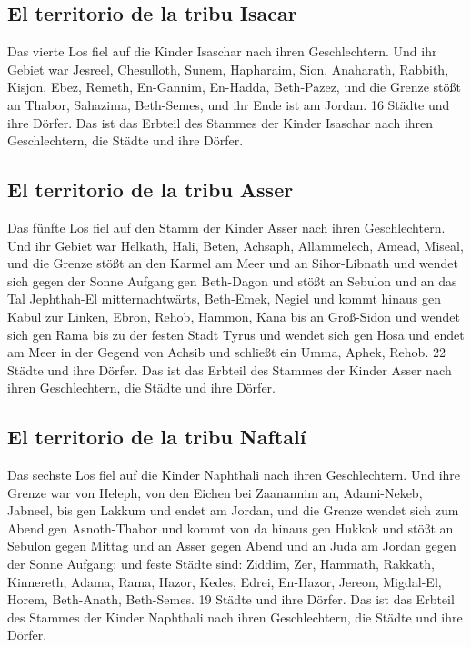 \hypertarget{el-territorio-de-la-tribu-isacar}{%
\subsection{El territorio de la tribu
Isacar}\label{el-territorio-de-la-tribu-isacar}}

 Das vierte Los fiel auf die Kinder Isaschar nach ihren
Geschlechtern.  Und ihr Gebiet war Jesreel, Chesulloth,
Sunem,  Hapharaim, Sion, Anaharath, 
Rabbith, Kisjon, Ebez,  Remeth, En-Gannim, En-Hadda,
Beth-Pazez,  und die Grenze stößt an Thabor, Sahazima,
Beth-Semes, und ihr Ende ist am Jordan. 16 Städte und ihre Dörfer.
 Das ist das Erbteil des Stammes der Kinder Isaschar nach
ihren Geschlechtern, die Städte und ihre Dörfer.

\hypertarget{el-territorio-de-la-tribu-asser}{%
\subsection{El territorio de la tribu
Asser}\label{el-territorio-de-la-tribu-asser}}

 Das fünfte Los fiel auf den Stamm der Kinder Asser nach
ihren Geschlechtern.  Und ihr Gebiet war Helkath, Hali,
Beten, Achsaph,  Allammelech, Amead, Miseal, und die
Grenze stößt an den Karmel am Meer und an Sihor-Libnath 
und wendet sich gegen der Sonne Aufgang gen Beth-Dagon und stößt an
Sebulon und an das Tal Jephthah-El mitternachtwärts, Beth-Emek, Negiel
und kommt hinaus gen Kabul zur Linken,  Ebron, Rehob,
Hammon, Kana bis an Groß-Sidon  und wendet sich gen Rama
bis zu der festen Stadt Tyrus und wendet sich gen Hosa und endet am Meer
in der Gegend von Achsib  und schließt ein Umma, Aphek,
Rehob. 22 Städte und ihre Dörfer.  Das ist das Erbteil
des Stammes der Kinder Asser nach ihren Geschlechtern, die Städte und
ihre Dörfer.

\hypertarget{el-territorio-de-la-tribu-naftaluxed}{%
\subsection{El territorio de la tribu
Naftalí}\label{el-territorio-de-la-tribu-naftaluxed}}

 Das sechste Los fiel auf die Kinder Naphthali nach ihren
Geschlechtern.  Und ihre Grenze war von Heleph, von den
Eichen bei Zaanannim an, Adami-Nekeb, Jabneel, bis gen Lakkum und endet
am Jordan,  und die Grenze wendet sich zum Abend gen
Asnoth-Thabor und kommt von da hinaus gen Hukkok und stößt an Sebulon
gegen Mittag und an Asser gegen Abend und an Juda am Jordan gegen der
Sonne Aufgang;  und feste Städte sind: Ziddim, Zer,
Hammath, Rakkath, Kinnereth,  Adama, Rama, Hazor,
 Kedes, Edrei, En-Hazor,  Jereon,
Migdal-El, Horem, Beth-Anath, Beth-Semes. 19 Städte und ihre Dörfer.
 Das ist das Erbteil des Stammes der Kinder Naphthali
nach ihren Geschlechtern, die Städte und ihre Dörfer.

